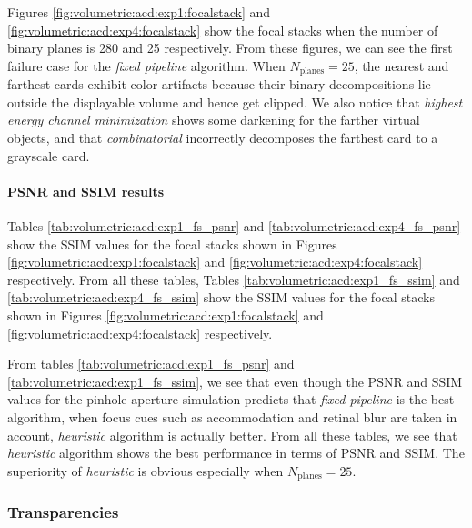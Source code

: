 Figures \ref{fig:volumetric:acd:exp1:focalstack} and \ref{fig:volumetric:acd:exp4:focalstack} show the focal stacks when the number of binary planes is 280 and 25 respectively. From these figures, we can see the first failure case for the \emph{fixed pipeline} algorithm. When $N_{\text{planes}}=25$, the nearest and farthest cards exhibit color artifacts because their binary decompositions lie outside the displayable volume and hence get clipped. We also notice that \emph{highest energy channel minimization} shows some darkening for the farther virtual objects, and that \emph{combinatorial} incorrectly decomposes the farthest card to a grayscale card. 





\paragraph{PSNR and SSIM results}
Tables \ref{tab:volumetric:acd:exp1_fs_psnr} and \ref{tab:volumetric:acd:exp4_fs_psnr} show the SSIM values for the focal stacks shown in Figures \ref{fig:volumetric:acd:exp1:focalstack} and \ref{fig:volumetric:acd:exp4:focalstack} respectively. From all these tables, 
Tables \ref{tab:volumetric:acd:exp1_fs_ssim} and \ref{tab:volumetric:acd:exp4_fs_ssim} show the SSIM values for the focal stacks shown in Figures \ref{fig:volumetric:acd:exp1:focalstack} and \ref{fig:volumetric:acd:exp4:focalstack} respectively. 

From tables \ref{tab:volumetric:acd:exp1_fs_psnr} and \ref{tab:volumetric:acd:exp1_fs_ssim}, we see that even though the PSNR and SSIM values for the pinhole aperture simulation predicts that \emph{fixed pipeline} is the best algorithm, when focus cues such as accommodation and retinal blur are taken in account, \emph{heuristic} algorithm is actually better. From all these tables, we see that \emph{heuristic} algorithm shows the best performance in terms of PSNR and SSIM. The superiority of \emph{heuristic} is obvious especially when $N_{\text{planes}} = 25$.

\subsubsection{Transparencies}




